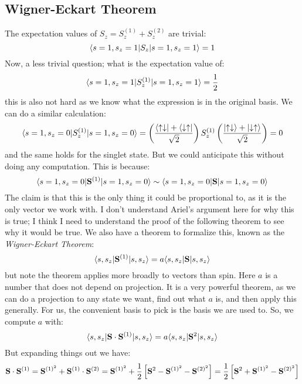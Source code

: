 \subsection{Wigner-Eckart Theorem}
The expectation values of $S_z = S_z^{(1)} + S_z^{(2)}$ are trivial:
\begin{equation}
    \langle s = 1, s_z = 1 \rvert S_z\lvert s = 1, s_z = 1 \rangle = 1
\end{equation}
Now, a less trivial question; what is the expectation value of:
\begin{equation}
    \langle s = 1, s_z = 1 \rvert S_z^{(1)}\lvert s = 1, s_z = 1 \rangle = \frac{1}{2}
\end{equation}
this is also not hard as we know what the expression is in the original basis. We can do a similar calculation:
\begin{equation}
    \langle s = 1, s_z = 0 \rvert S_z^{(1)}\lvert s = 1, s_z = 0 \rangle = \left(\frac{\langle \uparrow\downarrow \rvert + \langle \downarrow\uparrow \rvert}{\sqrt{2}}\right)S_z^{(1)} \left(\frac{\lvert \uparrow\downarrow \rangle + \lvert \downarrow\uparrow \rangle}{\sqrt{2}}\right) = 0
\end{equation}
and the same holds for the singlet state. But we could anticipate this without doing any computation. This is because:
\begin{equation}
    \langle s = 1, s_z = 0 \rvert\mathbf{S}^{(1)}\lvert s = 1, s_z = 0 \rangle \sim \langle s = 1, s_z = 0 \rvert\mathbf{S}\lvert s = 1, s_z = 0 \rangle
\end{equation}
The claim is that this is the only thing it could be proportional to, as it is the only vector we work with. I don't understand Ariel's argument here for why this is true; I think I need to understand the proof of the following theorem to see why it would be true. We also have a theorem to formalize this, known as the \emph{Wigner-Eckart Theorem}:
\begin{equation}
    \langle s,s_z \rvert\mathbf{S}^{(1)} \lvert s,s_z \rangle = a\langle s, s_z \rvert\mathbf{S}\lvert s, s_z \rangle
\end{equation}
but note the theorem applies more broadly to vectors than spin. Here $a$ is a number that does not depend on projection. It is a very powerful theorem, as we can do a projection to any state we want, find out what $a$ is, and then apply this generally. For us, the convenient basis to pick is the basis we are used to. So, we compute $a$ with:
\begin{equation}
    \langle s,s_z \rvert\mathbf{S} \cdot \mathbf{S}^{(1)}\lvert s,s_z \rangle = a\langle s, s_z \rvert\mathbf{S}^2\lvert s, s_z \rangle
\end{equation}
But expanding things out we have:
\begin{equation}
    \mathbf{S} \cdot \mathbf{S}^{(1)} = \mathbf{S}^{(1)^2} + \mathbf{S}^{(1)}\cdot\mathbf{S}^{(2)} = \mathbf{S}^{(1)^2} + \frac{1}{2}\left[\mathbf{S}^2 - \mathbf{S}^{(1)^2} - \mathbf{S}^{(2)^2}\right] = \frac{1}{2}\left[\mathbf{S}^2 + \mathbf{S}^{(1)^2} - \mathbf{S}^{(2)^2}\right]
\end{equation}
